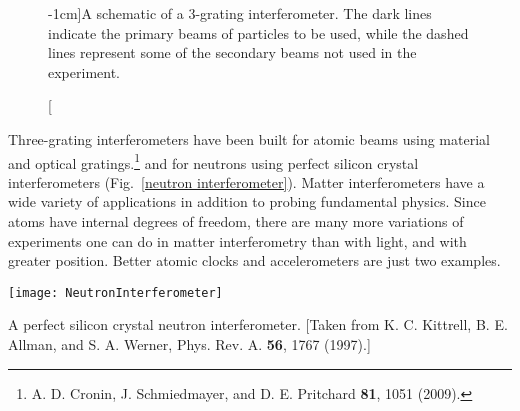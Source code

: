 \begin{figure}
\centering
{}
\caption[][-1cm]{A schematic of a 3-grating interferometer.  The dark lines indicate the primary beams of particles to be used, while the dashed lines represent some of the secondary beams not used in the experiment.}
\label{3-grating interferometer}
\end{figure}
Three-grating interferometers have been built for atomic beams using material and optical gratings.\footnote{A. D. Cronin, J. Schmiedmayer, and D. E. Pritchard {\bf 81}, 1051 (2009).} and for neutrons using perfect silicon crystal interferometers (Fig.~\ref{neutron interferometer}).  Matter interferometers have a wide variety of applications in addition to probing fundamental physics.  Since atoms have internal degrees of freedom, there are many more variations of experiments one can do in matter interferometry than with light, and with greater position.  Better atomic clocks and accelerometers are just two examples.
%
 \begin{marginfigure}
\begin{center}
\texttt{[image: NeutronInterferometer]}
\caption{A perfect silicon crystal neutron interferometer.  [Taken from K. C. Kittrell, B. E. Allman, and S. A. Werner, Phys. Rev. A. {\bf 56}, 1767 (1997).]}
\label{neutron interferometer}
\end{center}
\end{marginfigure}
%

